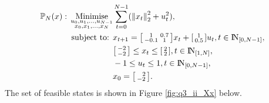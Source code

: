 \documentclass[a4paper,11pt,reqno]{amsart}
\newcommand{\N}{{\rm I\!N}}
\begin{document}
\begin{subequations}
    \begin{align}
        \mathbb{P}_N(x){}:{}
        \operatorname*{Minimise}_{\substack{u_0,u_1,\ldots,u_{N-1}\\ x_0,x_1,\ldots,x_N}}&\sum_{t=0}^{N-1} (\left\lVert x_t\right\rVert ^2_2+u_t^2),
        \\
        \text{subject to: }& x_{t+1} = 
        \begin{bsmallmatrix}
            1&0.7\\
            -0.1&1
        \end{bsmallmatrix}x_t + 
        \begin{bsmallmatrix}
            1\\
            0.5
        \end{bsmallmatrix}u_t, t\in\N_{[0,N-1]},
        \\
        &\begin{bsmallmatrix}
            -2\\
            -2
        \end{bsmallmatrix} 
        \leq x_t \leq 
        \begin{bsmallmatrix}
            2\\
            2
        \end{bsmallmatrix}, t\in\N_{[1,N]},
        \\
        &-1 \leq u_t \leq 1, t\in\N_{[0,N-1]},
        \\
        & x_0 = \begin{bsmallmatrix}\ \ 2\\-2\end{bsmallmatrix}.
    \end{align}
\end{subequations}
The set of feasible states is shown in Figure \ref{fig:q3_ii_Xx} below.
\end{document}
